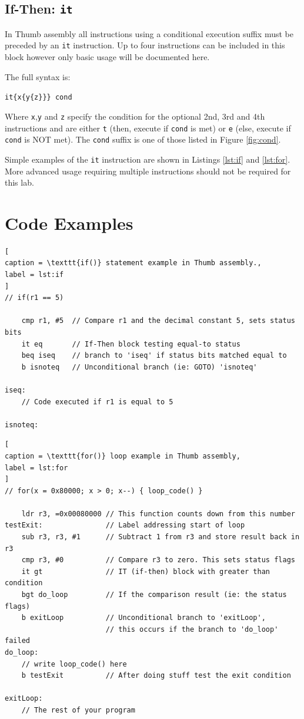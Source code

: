 \documentclass{UoNMCHA}
\numberwithin{equation}{section}
\begin{document}
\subsection{If-Then: \texttt{it}}

In Thumb assembly all instructions using a conditional execution suffix must be preceded by an \texttt{it} instruction. Up to four instructions can be included in this block however only basic usage will be documented here.

The full syntax is:

\texttt{it\{x\{y\{z\}\}\} cond}

Where \texttt{x},\texttt{y} and \texttt{z} specify the condition for the optional 2nd, 3rd and 4th instructions and are either \texttt{t} (then, execute if \texttt{cond} is met) or \texttt{e} (else, execute if \texttt{cond} is NOT met). The \texttt{cond} suffix is one of those listed in Figure \ref{fig:cond}.

Simple examples of the \texttt{it} instruction are shown in Listings \ref{lst:if} and \ref{lst:for}. More advanced usage requiring multiple instructions should not be required for this lab.

\vspace{7cm}

\pagebreak

\section{Code Examples}

\begin{lstlisting}[
caption = \texttt{if()} statement example in Thumb assembly.,
label = lst:if
]
// if(r1 == 5)

	cmp r1, #5	// Compare r1 and the decimal constant 5, sets status bits
	it eq		// If-Then block testing equal-to status
	beq iseq	// branch to 'iseq' if status bits matched equal to
	b isnoteq	// Unconditional branch (ie: GOTO) 'isnoteq'

iseq: 
	// Code executed if r1 is equal to 5

isnoteq:
\end{lstlisting}

\begin{lstlisting}[
caption = \texttt{for()} loop example in Thumb assembly,
label = lst:for
]
// for(x = 0x80000; x > 0; x--) { loop_code() }

    ldr r3, =0x00080000 // This function counts down from this number
testExit:               // Label addressing start of loop
    sub r3, r3, #1      // Subtract 1 from r3 and store result back in r3
    cmp r3, #0          // Compare r3 to zero. This sets status flags
    it gt               // IT (if-then) block with greater than condition
    bgt do_loop         // If the comparison result (ie: the status flags)
    b exitLoop          // Unconditional branch to 'exitLoop',
                        // this occurs if the branch to 'do_loop' failed
do_loop:
    // write loop_code() here
    b testExit          // After doing stuff test the exit condition

exitLoop:
    // The rest of your program
\end{lstlisting}
\end{document}
